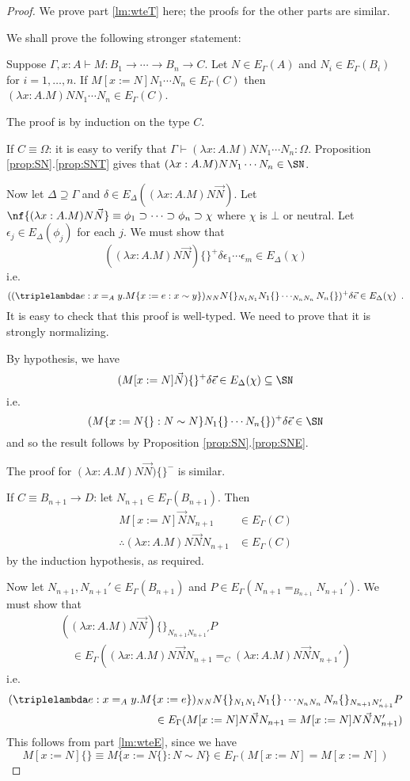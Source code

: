 \begin{proof}
We prove part \ref{lm:wteT} here; the proofs for the other parts are similar.

We shall prove the following stronger statement:

Suppose $\Gamma, x : A \vdash M : B_1 \rightarrow \cdots \rightarrow B_n \rightarrow C$.  Let $N \in E_\Gamma(A)$ and $N_i \in E_\Gamma(B_i)$ for $i = 1, \ldots, n$.  If
$M[x:=N]N_1 \cdots N_n \in E_\Gamma(C)$ then $(\lambda x:A.M)NN_1 \cdots N_n \in E_\Gamma(C)$.

The proof is by induction on the type $C$.

If $C \equiv \Omega$: it is easy to verify that $\Gamma \vdash (\lambda x:A.M)NN_1 \cdots N_n : \Omega$.  Proposition \ref{prop:SN}.\ref{prop:SNT}
gives that $(\lambda x:A.M)NN_1 \cdots N_n \in \SN$.

Now let $\Delta \supseteq \Gamma$ and $\delta \in E_\Delta((\lambda x:A.M)N \vec{N})$.  Let $\nf{(\lambda x:A.M)N \vec{N}} \equiv \phi_1 \supset \cdots \supset \phi_n \supset \chi$ where $\chi$ is $\bot$ or neutral.  Let $\epsilon_j \in E_\Delta(\phi_j)$ for each $j$.  We must show that
\[ ((\lambda x:A.M)N \vec{N})\{\}^+ \delta \epsilon_1 \cdots \epsilon_m
\in E_\Delta(\chi) \]
i.e.
\[ ((\triplelambda e:x =_A y. M \{ x:=e : x \sim y \})_{NN} N\{\}_{N_1 N_1}
N_1\{\} \cdots_{N_n N_n} N_n\{\})^+ \delta \vec{\epsilon} \in E_\Delta(\chi) \enspace . \]
It is easy to check that this proof is well-typed.  We need to prove that it is strongly normalizing.

By hypothesis, we have
\[ (M[x:=N] \vec{N})\{\}^+ \delta \vec{\epsilon} \in E_\Delta(\chi) \subseteq \SN \]
i.e.
\[ (M\{x:=N\{\} : N \sim N\} N_1 \{\} \cdots N_n \{\})^+ \delta \vec{\epsilon}
\in \SN \]
and so the result follows by Proposition \ref{prop:SN}.\ref{prop:SNE}.

The proof for $(\lambda x:A.M)N \vec{N})\{\}^-$ is similar.

If $C \equiv B_{n+1} \rightarrow D$: let $N_{n+1} \in E_{\Gamma}(B_{n+1})$.  Then
\begin{align*}
M[x:=N]\vec{N} N_{n+1} & \in E_\Gamma(C) \\
\therefore (\lambda x:A.M)N \vec{N} N_{n+1} & \in E_\Gamma(C)
\end{align*}
by the induction hypothesis, as required.

Now let $N_{n+1}, N_{n+1}' \in E_\Gamma(B_{n+1})$ and $P \in E_\Gamma(N_{n+1} =_{B_{n+1}} N_{n+1}')$.  We must show that
\begin{align*}
((\lambda x:A.M)N \vec{N}) \{\}_{N_{n+1}N_{n+1}'}P \\
\quad \in E_\Gamma((\lambda x:A.M) N \vec{N} N_{n+1} =_C (\lambda x:A.M) N \vec{N} N_{n+1}')
\end{align*}
i.e.
\begin{align*}
(\triplelambda e:x =_A y . M \{ x:=e \})_{NN} N \{ \}_{N_1 N_1} N_1\{\} \cdots_{N_n N_n} N_n\{\}_{N_{n+1} N_{n+1}'} P \\
\quad \in E_\Gamma(M[x:=N] N \vec{N} N_{n+1} = M[x:=N] N \vec{N} N_{n+1}')
\end{align*}
This follows from part \ref{lm:wteE}, since we have
\[ M[x:=N]\{\} \equiv M \{ x:= N \{ \} : N \sim N \} \in E_\Gamma(M[x:=N] = M[x:=N]) \]
\end{proof}
